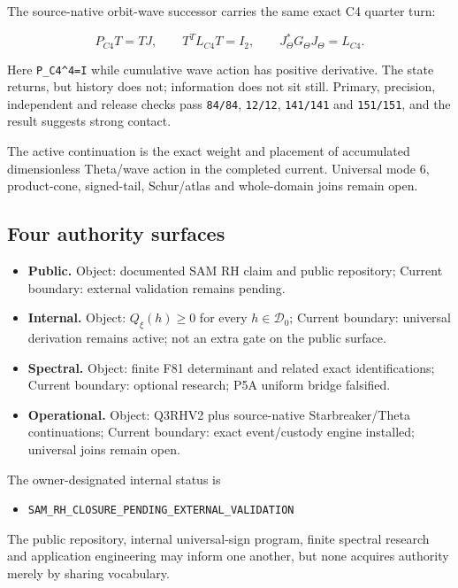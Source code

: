 The source-native orbit-wave successor carries the same exact C4 quarter
turn:

\[
P_{C4}T=TJ,
\qquad
T^TL_{C4}T=I_2,
\qquad
J_\Theta^*G_\Theta J_\Theta=L_{C4}.
\]

Here \texttt{P\_C4\^{}4=I} while cumulative wave action has positive
derivative. The state returns, but history does not; information does
not sit still. Primary, precision, independent and release checks pass
\texttt{84/84}, \texttt{12/12}, \texttt{141/141} and \texttt{151/151},
and the result suggests strong contact.

The active continuation is the exact weight and placement of accumulated
dimensionless Theta/wave action in the completed current. Universal mode
6, product-cone, signed-tail, Schur/atlas and whole-domain joins remain
open.

\subsection{Four authority surfaces}\label{viii-ch09-four-authority-surfaces}

\begin{itemize}
\tightlist
\item
  \textbf{Public.} Object: documented SAM RH claim and public
  repository; Current boundary: external validation remains pending.
\item
  \textbf{Internal.} Object: \(Q_\xi(h)\ge0\) for every
  \(h\in\mathcal D_0\); Current boundary: universal derivation remains
  active; not an extra gate on the public surface.
\item
  \textbf{Spectral.} Object: finite F81 determinant and related exact
  identifications; Current boundary: optional research; P5A uniform
  bridge falsified.
\item
  \textbf{Operational.} Object: Q3RHV2 plus source-native
  Starbreaker/Theta continuations; Current boundary: exact event/custody
  engine installed; universal joins remain open.
\end{itemize}

The owner-designated internal status is

\begin{itemize}
\tightlist
\item
  \nolinkurl{SAM_RH_CLOSURE_PENDING_EXTERNAL_VALIDATION}
\end{itemize}

The public repository, internal universal-sign program, finite spectral
research and application engineering may inform one another, but none
acquires authority merely by sharing vocabulary.

